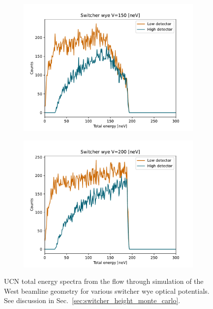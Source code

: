 \begin{figure}
\begin{subfigure}{.5\textwidth}
  \includegraphics[width=\textwidth]{figures/fermi150_E_hist.pdf}
  \caption{}\label{subfig:V=150_simul}
\end{subfigure}%
\begin{subfigure}{.5\textwidth}
  \centering
  \includegraphics[width=\textwidth]{figures/fermi200_E_hist.pdf}
  \caption{}\label{subfig:V=200_simul}
\end{subfigure}
\caption
{UCN total energy spectra from the flow through simulation of the West beamline geometry for various switcher wye optical potentials. See discussion in Sec.~\ref{sec:switcher_height_monte_carlo}.}
\label{fig:y_E_hist_pentrack}
\end{figure}

